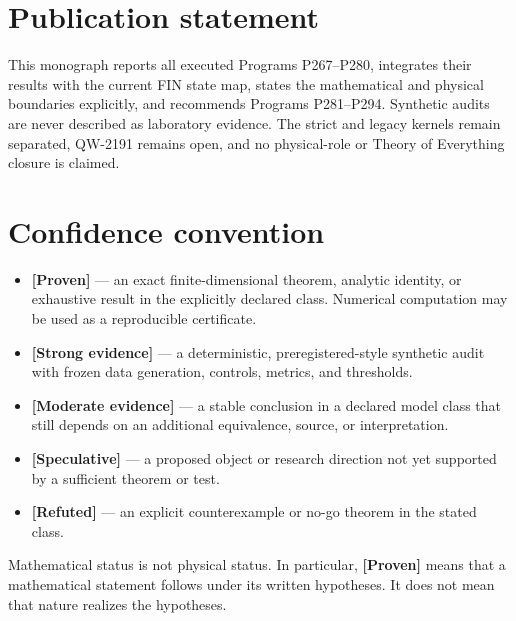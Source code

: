 \documentclass[11pt,a4paper,openany]{report}
\newcommand{\statusProven}{\textcolor{fingreen}{[Proven]}}
\newcommand{\statusStrong}{\textcolor{finblue}{[Strong evidence]}}
\newcommand{\statusModerate}{\textcolor{finviolet}{[Moderate evidence]}}
\newcommand{\statusSpeculative}{\textcolor{finorange}{[Speculative]}}
\newcommand{\statusRefuted}{\textcolor{finred}{[Refuted]}}
\begin{document}
\chapter*{Publication statement}
This monograph reports all executed Programs P267--P280, integrates their
results with the current FIN state map, states the mathematical and physical
boundaries explicitly, and recommends Programs P281--P294. Synthetic audits
are never described as laboratory evidence. The strict and legacy kernels
remain separated, QW-2191 remains open, and no physical-role or Theory of
Everything closure is claimed.

\tableofcontents
\clearpage
{}

\chapter*{Confidence convention}

\begin{itemize}
\item 
\textbf{\statusProven{}} --- an exact finite-dimensional theorem, analytic identity, or exhaustive result in the explicitly declared class. Numerical computation may be used as a reproducible certificate.

\item 
\textbf{\statusStrong{}} --- a deterministic, preregistered-style synthetic audit with frozen data generation, controls, metrics, and thresholds.

\item 
\textbf{\statusModerate{}} --- a stable conclusion in a declared model class that still depends on an additional equivalence, source, or interpretation.

\item 
\textbf{\statusSpeculative{}} --- a proposed object or research direction not yet supported by a sufficient theorem or test.

\item 
\textbf{\statusRefuted{}} --- an explicit counterexample or no-go theorem in the stated class.

\end{itemize}

Mathematical status is not physical status. In particular, \textbf{\statusProven{}} means that a mathematical statement follows under its written hypotheses. It does not mean that nature realizes the hypotheses.
\end{document}
